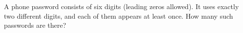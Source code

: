 A phone password consists of six digits (leading zeros allowed). It uses exactly two different digits, and each of them appears at least once. How many such passwords are there?
